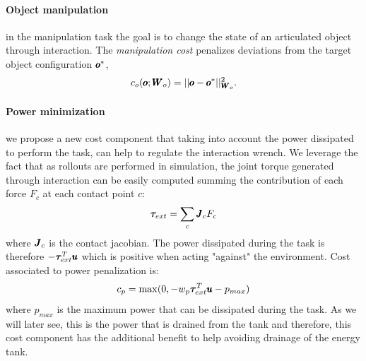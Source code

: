  \paragraph{Object manipulation} in the manipulation task the goal is to change the state of an articulated object through interaction. The \textit{manipulation cost} penalizes deviations from the target object configuration $\pmb{o}^{*}$,
\begin{equation}
    c_o(\pmb{o}; \pmb{W}_{o}) = || \pmb{o} - \pmb{o}^{*}||^2_{\pmb{W}_{o}}.
\end{equation}
\paragraph{Power minimization} we propose a new cost component that taking into account the power dissipated to perform the task, can help to regulate the interaction wrench. We leverage the fact that as rollouts are performed in simulation, the joint torque generated through interaction can be easily computed summing the contribution of each force $F_c$ at each contact point $c$:
\begin{equation}
\boldsymbol{\tau}_{ext} = \sum\limits_{c} \pmb{J}_c F_c    
\end{equation}
where $\pmb{J}_c$ is the contact jacobian. The power dissipated during the task is therefore $-\boldsymbol{\tau}_{ext}^T\pmb{u}$ which is positive when acting "against" the environment. Cost associated to power penalization is:
\begin{equation}
   c_p = \max(0, -w_{p} \boldsymbol{\tau}_{ext}^T\pmb{u} - p_{max})      
 \end{equation}
where $p_{max}$ is the maximum power that can be dissipated during the task.
As we will later see, this is the power that is drained from the tank and therefore, this cost component has the additional benefit to help avoiding drainage of the energy tank.
 
